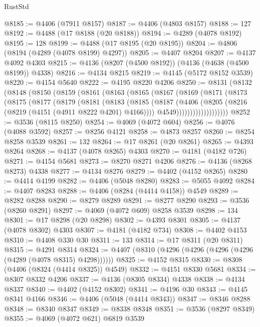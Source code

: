 \begin{lexlean}{RustStd}
\begin{coremodule}
@8185 := @4406 (@7911 @8157)
@8187 := @4406 (@4803 @8157)
@8188 := 127
@8192 := @4488 (@17 @8188 (@20 @8188))
@8194 := @4289 (@4078 @8192)
@8195 := 128
@8199 := @4488 (@17 @8195 (@20 @8195))
@8204 := @4806 (@8194 (@4289 (@4078 @8199) @4297))
@8205 := @4407 @8204
@8207 := @4137 @4092 @4303
@8215 := @4136 (@8207 (@4500 @8192)) (@4136 (@4638 (@4500 @8199)) @4338)
@8216 := @4134 @8215
@8219 := @4145 (@5172 @8152 @3539)
@8220 := @4154 @5640
@8222 := @4195 @8220 @4206
@8250 := @8131
    (@8132
      (@8148
        (@8150
          (@8159
            (@8161
              (@8163
                (@8165
                  (@8167
                    (@8169
                      (@8171
                        (@8173
                          (@8175
                            (@8177
                              (@8179
                                (@8181
                                  (@8183
                                    (@8185
                                      (@8187
                                        (@4406
                                          (@8205 (@8216 (@8219 (@4151 (@4911 @8222 @4201) @4166))))
                                          @4549)))))))))))))))))))
@8252 := @3536 (@8115 @8250)
@8254 := @4069 (@4072 @604)
@8256 := @4076 (@4088 @3592)
@8257 := @8256 @4121
@8258 := @4873 @8257
@8260 := @8254 @8258 @3539
@8261 := 132
@8264 := @17 @8261 (@20 @8261)
@8265 := @4393 @8264
@8268 := @4137 (@4078 @8265) @4303
@8270 := @4181 (@4182 @726)
@8271 := @4154 @5681
@8273 := @8270 @8271 @4206
@8276 := @4136 (@8268 @8273) @4338
@8277 := @4134 @8276
@8279 := @4402 (@4152 @8265)
@8280 := @4414 @4199
@8282 := @4406 (@5048 @8280)
@8283 := @5055 @4092
@8284 := @4407 @8283
@8288 := @4406 (@8284 (@4414 @4158)) @4549
@8289 := @8282 @8288
@8290 := @8279 @8289
@8291 := @8277 @8290
@8293 := @3536 (@8260 @8291)
@8297 := @4069 (@4072 @609) @8258 @3539
@8298 := 134
@8301 := @17 @8298 (@20 @8298)
@8302 := @4393 @8301
@8305 := @4137 (@4078 @8302) @4303
@8307 := @4181 (@4182 @734)
@8308 := @4402 @4153
@8310 := @4408 @330 @30
@8311 := 133
@8314 := @17 @8311 (@20 @8311)
@8315 := @4291 @8314
@8324 := @4407 (@8310 (@4296 (@4296 (@4296 (@4296 (@4289 (@4078 @8315) @4298))))))
@8325 := @4152 @8315
@8330 := @8308 (@4406 (@8324 (@4414 @8325)) @4549)
@8332 := @4151 @8330 @5681
@8334 := @8307 @8332 @4206
@8337 := @4136 (@8305 @8334) @4338
@8338 := @4134 @8337
@8340 := @4402 (@4152 @8302)
@8341 := @4196 @30
@8343 := @4145 @8341 @4166
@8346 := @4406 (@5048 (@4414 @8343))
@8347 := @8346 @8288
@8348 := @8340 @8347
@8349 := @8338 @8348
@8351 := @3536 (@8297 @8349)
@8355 := @4069 (@4072 @621) @6819 @3539

\end{coremodule}
\end{lexlean}
